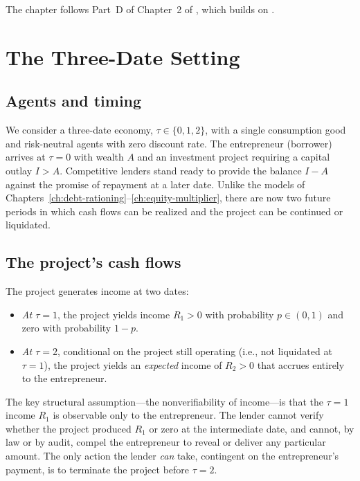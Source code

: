 \documentclass[11pt,a4paper,oneside]{book}
\theoremstyle{plain}
\theoremstyle{definition}
\theoremstyle{remark}
\numberwithin{equation}{chapter}
\begin{document}
The chapter follows Part~D of Chapter~2 of \citet{Tirole2006}, which builds on \citet{BoltonScharfstein1990}.

\section{The Three-Date Setting}
\label{sec:NV-setting}

\subsection{Agents and timing}

We consider a three-date economy, $\tau \in \{0, 1, 2\}$, with a single consumption good and risk-neutral agents with zero discount rate.
The entrepreneur (borrower) arrives at $\tau = 0$ with wealth $A$ and an investment project requiring a capital outlay $I > A$.
Competitive lenders stand ready to provide the balance $I - A$ against the promise of repayment at a later date.
Unlike the models of Chapters~\ref{ch:debt-rationing}--\ref{ch:equity-multiplier}, there are now two future periods in which cash flows can be realized and the project can be continued or liquidated.

\subsection{The project's cash flows}

The project generates income at two dates:
\begin{itemize}
  \item \emph{At $\tau = 1$}, the project yields income $R_1 > 0$ with probability $p \in (0, 1)$ and zero with probability $1 - p$.
  \item \emph{At $\tau = 2$}, conditional on the project still operating (i.e., not liquidated at $\tau = 1$), the project yields an \emph{expected} income of $R_2 > 0$ that accrues entirely to the entrepreneur.
\end{itemize}
The key structural assumption---the nonverifiability of income---is that the $\tau = 1$ income $R_1$ is observable only to the entrepreneur.
The lender cannot verify whether the project produced $R_1$ or zero at the intermediate date, and cannot, by law or by audit, compel the entrepreneur to reveal or deliver any particular amount.
The only action the lender \emph{can} take, contingent on the entrepreneur's payment, is to terminate the project before $\tau = 2$.
\end{document}
